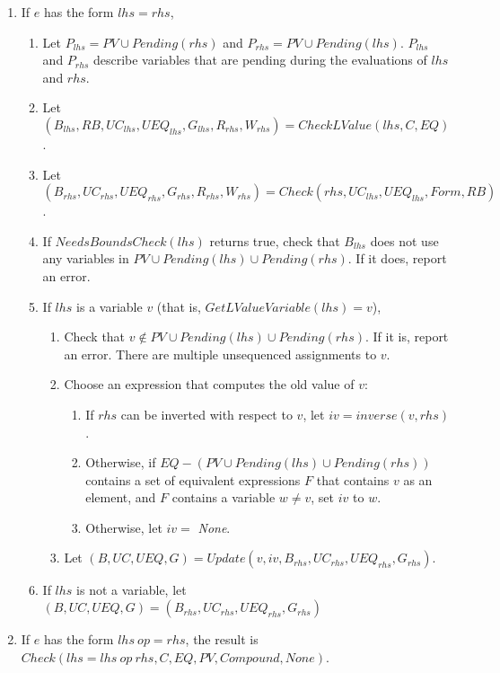 \begin{enumerate}
\begin{enumerate}
\item If $e$ has the form $lhs = rhs$,
\label{list:check-assignment-struct}
\begin{enumerate}
\item Let $P_{lhs} = PV \cup Pending(rhs)$ and $P_{rhs} = PV \cup Pending(lhs).$   $P_{lhs}$
        and $P_{rhs}$ describe variables that are pending during the evaluations of $lhs$ and $rhs$.
\item Let $(B_{lhs}, RB, \mathit{UC}_{lhs}, {UEQ}_{lhs}, G_{lhs}, R_{rhs}, W_{rhs}) = CheckLValue(lhs, C, EQ)$.  
\item Let $(B_{rhs},  \mathit{UC}_{rhs}, {UEQ}_{rhs}, G_{rhs}, R_{rhs}, W_{rhs}) = 
Check(rhs, \mathit{UC}_{lhs}, {UEQ}_{lhs}, Form, RB)$.
\item If $NeedsBoundsCheck(lhs)$ returns true, check that $B_{lhs}$ does not use any variables in 
$PV \cup Pending(lhs) \cup Pending(rhs)$.  If it does, report an error.
\item  If $lhs$ is a variable $v$ (that is, $GetLValueVariable(lhs) = { v }$),
\begin{enumerate}
\item Check that $v \notin PV \cup Pending(lhs) \cup Pending(rhs)$.  If it is, report an error.  
There are multiple unsequenced assignments to $v$.
\item Choose an expression that computes the old value of $v$:
\begin{enumerate}
\item If $rhs$ can be inverted with respect to $v$, let $iv = inverse(v, rhs)$. 
\item Otherwise, if $EQ - (PV \cup Pending(lhs) \cup Pending(rhs))$ contains a set of equivalent expressions $F$ that contains $v$ as 
an element, and $F$ contains a variable $w \neq v$, set $iv$ to $w$.
\item Otherwise, let $iv = $ {\it None}.
\end{enumerate}
\item Let $(B, \mathit{UC}, UEQ, G) = Update(v, iv, B_{rhs}, \mathit{UC}_{rhs}, UEQ_{rhs}, G_{rhs})$.
\end{enumerate}
\item If $lhs$ is not a variable, let $(B, \mathit{UC}, UEQ, G) = (B_{rhs}, \mathit{UC}_{rhs}, UEQ_{rhs}, G_{rhs})$
\end{enumerate}


\item If $e$ has the form $lhs~op= rhs$, the result is 
$Check (lhs = lhs~op~rhs, C, EQ, PV, Compound, None)$.


\end{enumerate}
\end{enumerate}
